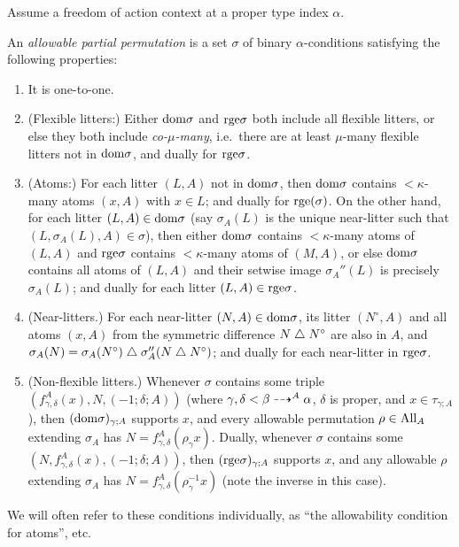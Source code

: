 \begin{definition}
  \label{def:allowable-partial-perm}
  Assume a freedom of action context at a proper type index $\alpha$.

  An \emph{allowable partial permutation} is a set $\sigma$ of binary $\alpha$-conditions satisfying the following properties:
  \begin{enumerate}
  \item It is one-to-one.
  \item (Flexible litters:)  Either $\mathrm{dom} \sigma$ and $\mathrm{rge} \sigma$ both include all flexible litters, or else they both include \emph{co-$\mu$-many}, i.e.\ there are at least $\mu$-many flexible litters not in $\mathrm{dom} \sigma$, and dually for $\mathrm{rge} \sigma$.
  \item (Atoms:) For each litter $(L,A)$ not in $\mathrm{dom} \sigma$, then $\mathrm{dom} \sigma$ contains $<\kappa$-many atoms $(x,A)$ with $x \in L$; and dually for $\mathrm{rge}(\sigma)$.  On the other hand, for each litter $(L,A) \in \mathrm{dom} \sigma$ (say $\sigma_A(L)$ is the unique near-litter such that $(L,\sigma_A(L),A) \in \sigma$), then either $\mathrm{dom} \sigma$ contains $<\kappa$-many atoms of $(L,A)$ and $\mathrm{rge} \sigma$ contains $<\kappa$-many atoms of $(M,A)$, or else $\mathrm{dom} \sigma$ contains all atoms of $(L,A)$ and their setwise image $\sigma_A''(L)$ is precisely $\sigma_A(L)$; and dually for each litter $(L,A) \in \mathrm{rge} \sigma$.
  \item (Near-litters.) For each near-litter $(N,A) \in \mathrm{dom} \sigma$, its litter $(N^\circ,A)$ and all atoms $(x,A)$ from the symmetric difference $N \mathrel{\triangle} N^\circ$ are also in $A$, and $\sigma_A(N) = \sigma_A(N^\circ) \mathrel{\triangle} \sigma_A''(N \mathrel{\triangle} N^\circ)$; and dually for each near-litter in $\mathrm{rge} \sigma$.
  \item (Non-flexible litters.) Whenever $\sigma$ contains some triple $(f^A_{\gamma,\delta}(x),N,(-1;\delta;A))$ (where $\gamma,\delta < \beta \dashrightarrow^A \alpha$, $\delta$ is proper, and $x \in \tau_{\gamma;A}$), then $(\mathrm{dom} \sigma)_{\gamma;A}$ supports $x$, and every allowable permutation $\rho \in \mathrm{All}_A$ extending $\sigma_A$ has $N = f^A_{\gamma,\delta}(\rho_\gamma x)$.  Dually, whenever $\sigma$ contains some $(N,f^A_{\gamma,\delta}(x),(-1;\delta;A))$, then $(\mathrm{rge} \sigma)_{\gamma;A}$ supports $x$, and any allowable $\rho$ extending $\sigma_A$ has $N = f^A_{\gamma,\delta}(\rho^{-1}_\gamma x)$ (note the inverse in this case).
  \end{enumerate}

  We will often refer to these conditions individually, as “the allowability condition for atoms”, etc.
\end{definition}

